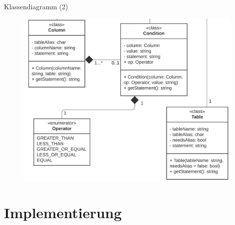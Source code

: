 \documentclass[toc]{beamer}
\begin{document}
        \begin{frame}{Klassendiagramm (2)}
        
        
            \begin{figure}[htp]
                   \includegraphics[scale=0.17]{UML-Klasse_crop.png}
                    
                    \end{figure}
        \end{frame}
        
\section{Implementierung}
\end{document}
